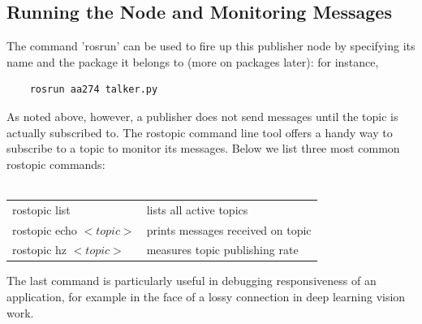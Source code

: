 \documentclass[twoside]{article}
\begin{document}
\subsection{Running the Node and Monitoring Messages}
The command 'rosrun' can be used to fire up this publisher node by specifying its name and the package it belongs to (more on packages later): for instance,
\begin{verbatim}
	rosrun aa274 talker.py 
\end{verbatim}
As noted above, however, a publisher does not send messages until the topic is actually subscribed to. The rostopic command line tool offers a handy way to subscribe to a topic to monitor its messages. Below we list three most common rostopic commands:\\ \\
{\ttfamily
\begin{tabular}{l l}
rostopic list & lists all active topics \\
rostopic echo $<topic>$ & prints messages received on topic \\
rostopic hz $<topic>$ & measures topic publishing rate \\
\end{tabular}
}

The last command is particularly useful in debugging responsiveness of an application, for example in the face of a lossy connection in deep learning vision work.  
\end{document}
